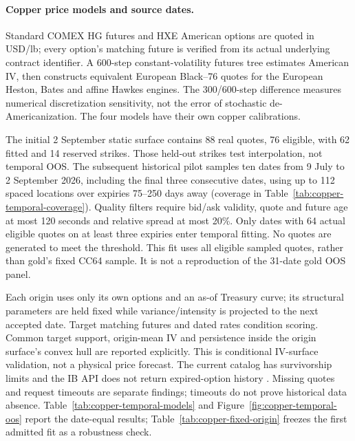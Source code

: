 \paragraph{Copper price models and source dates.}
Standard COMEX HG futures and HXE American options are quoted in USD/lb;
every option's matching future is verified from its actual underlying
contract identifier. A 600-step constant-volatility futures tree estimates
American IV, then constructs equivalent European Black--76 quotes for the
European Heston, Bates and affine Hawkes engines. The 300/600-step difference
measures numerical discretization sensitivity, not the error of stochastic
de-Americanization. The four models have their own copper calibrations.

The initial 2 September static surface contains 88 real quotes, 76 eligible,
with 62 fitted and 14 reserved strikes. Those held-out strikes test
interpolation, not temporal OOS. The subsequent historical pilot samples ten
dates from 9 July to 2 September 2026, including the final three consecutive
dates, using up to 112 spaced locations over expiries
75--250 days away (coverage in Table~\ref{tab:copper-temporal-coverage}).
Quality filters require bid/ask validity, quote and future
age at most 120 seconds and relative spread at most 20\%. Only dates with
64 actual eligible quotes on at least three expiries enter temporal fitting.
No quotes are generated to meet the threshold. This fit uses all eligible
sampled quotes, rather than gold's fixed CC64 sample. It is not a
reproduction of the 31-date gold OOS panel.

Each origin uses only its own options and an as-of Treasury curve; its
structural parameters are held fixed while variance/intensity is projected to
the next accepted date. Target matching futures and dated rates condition
scoring. Common target support, origin-mean IV and persistence inside the
origin surface's convex hull are reported explicitly. This is conditional
IV-surface validation, not a physical price forecast. The current catalog
has survivorship limits and the IB API does not return expired-option history
\cite{ib-historical-limitations}. Missing quotes and request timeouts are
separate findings; timeouts do not prove historical data absence.
Table~\ref{tab:copper-temporal-models} and
Figure~\ref{fig:copper-temporal-oos} report the date-equal results;
Table~\ref{tab:copper-fixed-origin} freezes the first admitted fit as a
robustness check.


